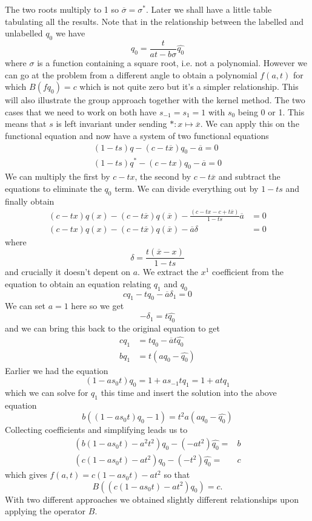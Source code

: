 \documentclass[12pt]{article}
\theoremstyle{definition} \newtheorem{definition}[theorem]{Definition}
\newcommand{\ol}[1]{\overline{#1}}
\newcommand{\wh}{\widehat}
\begin{document}
The two roots multiply to 1 so $\ol{\sigma} = \sigma^\ast$. Later we shall have a little table tabulating all the results.
Note that in the relationship between the labelled and unlabelled $q_0$ we have
\[
	q_0 = \frac{t}{at-b\sigma}\wh{q_0}
\]
where $\sigma$ is a function containing a square root, i.e. not a polynomial. However we can go at the problem from a different angle to obtain a polynomial $f(a,t)$ for which $B(fq_0) = c$ which is not quite zero but it's a simpler relationship. This will also illustrate the group approach together with the kernel method. The two cases that we need to work on both have $s_{-1} = s_1 = 1$ with $s_0$ being 0 or 1. This means that $s$ is left invariant under sending $\ast: x \mapsto \ol{x}$. We can apply this on the functional equation and now have a system of two functional equations
\begin{align*}
	(1-ts)q - (c -t\ol{x})q_0 - \ol{a}=0\\
	(1-ts)q^\ast - (c -tx)q_0 -\ol{a}=0
\end{align*}
We can multiply the first by $c -tx$, the second by $c -t\ol{x}$ and subtract the equations to eliminate the $q_0$ term. We can divide everything out by $1-ts$ and finally obtain
\begin{align*}
	(c-tx)q(x) - (c-t\ol{x})q(\ol{x}) -\frac{(c-tx-c+t\ol{x})}{1-ts}\ol{a} &= 0\\
	(c-tx)q(x) - (c-t\ol{x})q(\ol{x}) -\ol{a}\delta &= 0
\end{align*}
where
\[
	\delta =\frac{t(\ol{x}-x)}{1-ts}
\]
and crucially it doesn't depent on $a$. We extract the $x^1$ coefficient from the equation to obtain an equation relating $q_1$ and $q_0$
\[
	c q_1 - t q_0 - \ol{a}\delta_1 = 0
\]
We can set $a = 1$ here so we get
\[
	-\delta_1 = t \wh{q_0}
\]
and we can bring this back to the original equation to get
\begin{align*}
	c q_1 &= t q_0 - \ol{a} t \wh{q_0}\\
	b q_1 &= t (aq_0 - \wh{q_0})
\end{align*}
Earlier we had the equation
\[
	(1-as_0t)q_0 = 1 + a s_{-1} t q_1 = 1 + at q_1
\]
which we can solve for $q_1$ this time and insert the solution into the above equation
\[
	b ((1-as_0t)q_0-1) = t^2 a (aq_0 - \wh{q_0})
\]
Collecting coefficients and simplifying leads us to
\begin{align*}
	(b(1-as_0t)-a^2 t^2) q_0 -(-at^2)\wh{q_0} =& b\\
	(c(1-as_0t)-a t^2) q_0 -(-t^2)\wh{q_0} =& c
\end{align*}
which gives $f(a,t) = c(1-as_0t)-a t^2$ so that
\[
	B((c(1-as_0t)-a t^2)q_0) = c.
\]
With two different approaches we obtained slightly different relationships upon applying the operator $B$.
\end{document}
